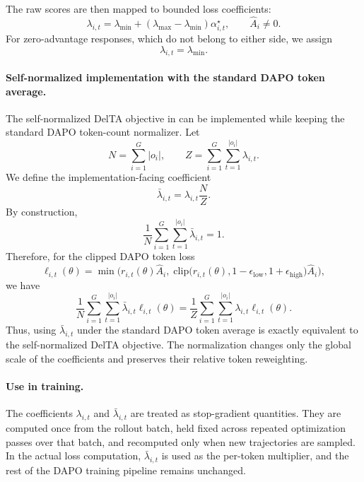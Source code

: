 \documentclass{article} %
\begin{document}
The raw scores are then mapped to bounded loss coefficients:
\[
\lambda_{i,t}
=
\lambda_{\min}
+
(\lambda_{\max}-\lambda_{\min})\alpha_{i,t}^{\star},
\qquad \hat A_i\ne 0.
\]
For zero-advantage responses, which do not belong to either side, we assign
\[
\lambda_{i,t}=\lambda_{\min}.
\]


\paragraph{Self-normalized implementation with the standard DAPO token average.}
The self-normalized DelTA objective in  can be implemented while keeping the standard DAPO token-count normalizer.
Let
\[
N
=
\sum_{i=1}^{G}|o_i|,
\qquad
Z
=
\sum_{i=1}^{G}\sum_{t=1}^{|o_i|}\lambda_{i,t}.
\]
We define the implementation-facing coefficient
\[
\bar\lambda_{i,t}
=
\lambda_{i,t}\frac{N}{Z}.
\]
By construction,
\[
\frac{1}{N}
\sum_{i=1}^{G}\sum_{t=1}^{|o_i|}
\bar\lambda_{i,t}
=
1.
\]
Therefore, for the clipped DAPO token loss
\[
\ell_{i,t}(\theta)
=
\min\!\Big(
r_{i,t}(\theta)\hat A_i,\;
\mathrm{clip}\!\big(
r_{i,t}(\theta),
1-\epsilon_{\mathrm{low}},
1+\epsilon_{\mathrm{high}}
\big)\hat A_i
\Big),
\]
we have
\[
\frac{1}{N}
\sum_{i=1}^{G}\sum_{t=1}^{|o_i|}
\bar\lambda_{i,t}\ell_{i,t}(\theta)
=
\frac{1}{Z}
\sum_{i=1}^{G}\sum_{t=1}^{|o_i|}
\lambda_{i,t}\ell_{i,t}(\theta).
\]
Thus, using \(\bar\lambda_{i,t}\) under the standard DAPO token average is exactly equivalent to the self-normalized DelTA objective.
The normalization changes only the global scale of the coefficients and preserves their relative token reweighting.

\paragraph{Use in training.}
The coefficients \(\lambda_{i,t}\) and \(\bar\lambda_{i,t}\) are treated as stop-gradient quantities.
They are computed once from the rollout batch, held fixed across repeated optimization passes over that batch, and recomputed only when new trajectories are sampled.
In the actual loss computation, \(\bar\lambda_{i,t}\) is used as the per-token multiplier, and the rest of the DAPO training pipeline remains unchanged.
\end{document}
